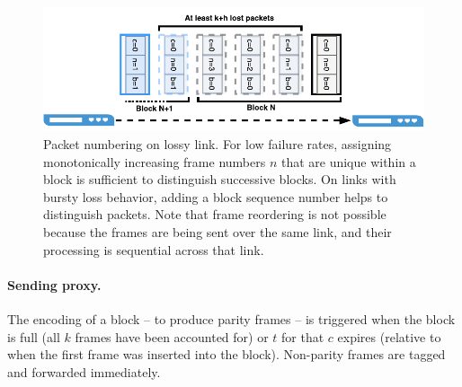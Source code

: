 \begin{figure}
  \centering
  \includegraphics[width=0.35\paperwidth]{figures/example-loss.pdf}
  \caption{\label{fig:example-loss}Packet numbering on lossy link.  For low failure
  rates, assigning monotonically increasing frame numbers $n$ that are unique within a
  block is sufficient to distinguish successive blocks.  
  On links with bursty loss behavior, adding
  a block sequence number helps to distinguish packets.
  Note that frame
  reordering is not possible because the frames are being sent over the same link,
  and their processing is sequential across that link.}
\end{figure}

\paragraph{Sending proxy.}
The encoding of a block -- to produce parity frames -- is
triggered when the block is full (all $k$ frames have been accounted for) or
$t$ for that $c$ expires (relative to when the first frame was inserted into
the block). Non-parity frames are tagged and forwarded immediately.

